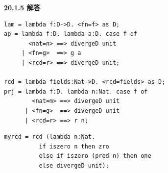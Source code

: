 \begin{taplauthorsolutionentrybox}
\label{sol:author:20.1.5}
\textbf{20.1.5 解答}

\begin{lstlisting}
lam = lambda f:D->D. <fn=f> as D;
ap = lambda f:D. lambda a:D. case f of
       <nat=n> ==> divergeD unit
     | <fn=g>  ==> g a
     | <rcd=r> ==> divergeD unit;

rcd = lambda fields:Nat->D. <rcd=fields> as D;
prj = lambda f:D. lambda n:Nat. case f of
        <nat=m> ==> divergeD unit
      | <fn=g>  ==> divergeD unit
      | <rcd=r> ==> r n;

\end{lstlisting}

\pagebreak[4]
\begin{lstlisting}
myrcd = rcd (lambda n:Nat.
          if iszero n then zro
          else if iszero (pred n) then one
          else divergeD unit);
\end{lstlisting}


\end{taplauthorsolutionentrybox}

